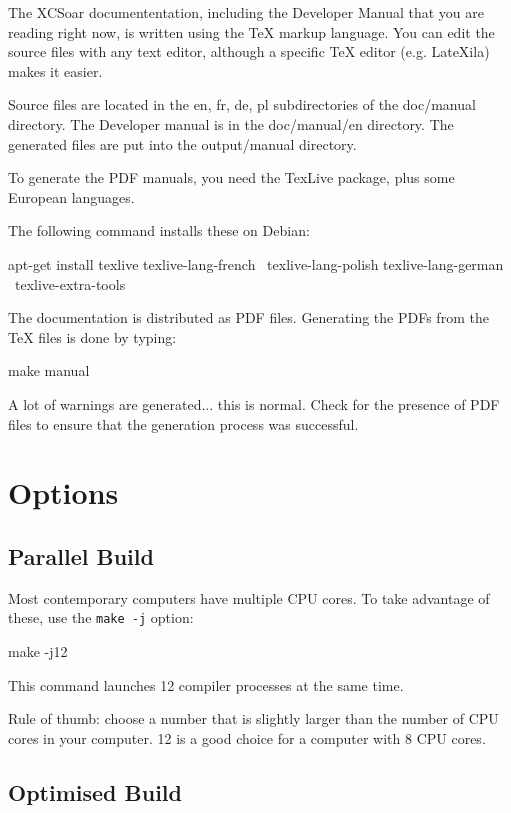 The XCSoar documententation, including the Developer Manual that you are 
reading right now, is written using the TeX markup language. You can edit
the source files with any text editor, although a specific TeX editor (e.g. LateXila) 
makes it easier. 

Source files are located in the en, fr, de, pl subdirectories of the doc/manual directory. 
The Developer manual is in the doc/manual/en directory. The generated files are put into
the output/manual directory.

To generate the PDF manuals, you need the TexLive package, plus some European languages.

The following command installs these on Debian:

\begin{verbatim*}
apt-get install texlive texlive-lang-french \
  texlive-lang-polish texlive-lang-german \
  texlive-extra-tools
\end{verbatim*}

The documentation is distributed as PDF files. Generating the PDFs from the 
TeX files is done by typing:

\begin{verbatim*}
make manual
\end{verbatim*}

A lot of warnings are generated... this is normal. Check for the presence of PDF files 
to ensure that the generation process was successful.
\section{Options}

\subsection{Parallel Build}

Most contemporary computers have multiple CPU cores.  To take
advantage of these, use the \texttt{make -j} option:

\begin{verbatim*}
make -j12
\end{verbatim*}

This command launches 12 compiler processes at the same time.

Rule of thumb: choose a number that is slightly larger than the number
of CPU cores in your computer.  12 is a good choice for a computer
with 8 CPU cores.

\subsection{Optimised Build}

